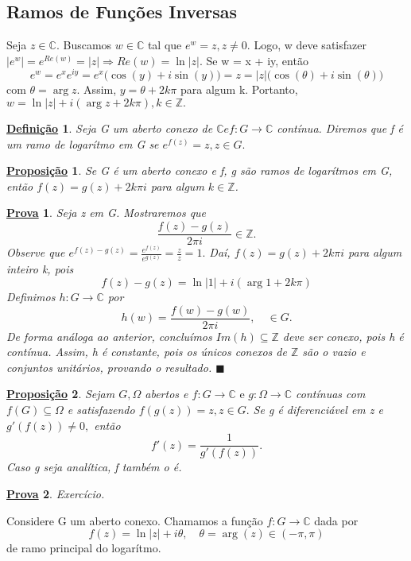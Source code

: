 \documentclass{article}
\newtheorem*{def*}{\underline{Defini\c c\~ao}}
\newtheorem*{proof*}{\underline{Prova}}
\newtheorem*{prop*}{\underline{Proposi\c c\~ao}}
\renewcommand\qedsymbol{$\blacksquare$}
\begin{document}
  \subsection{Ramos de Fun\c c\~oes Inversas}
  Seja $z\in \mathbb{C}.$ Buscamos $w\in \mathbb{C}$ tal que $e^{w} = z, z\neq0.$ Logo, w deve satisfazer $|e^{w}|
  = e^{Re(w)} = |z|\Rightarrow Re(w) = \ln{|z|}.$ Se w = x + iy, ent\~ao
  $$
  e^{w} = e^{x}e^{iy} = e^{x}\biggl(\cos{(y)} + i\sin{(y)}\biggr) = z = |z|\biggl(\cos{(\theta)} + i\sin{(\theta)}\biggr)
  $$
  com $\theta = \arg{z}.$ Assim, $y = \theta + 2k\pi$ para algum k. Portanto, $w = \ln{|z|} + i(\arg{z} + 2k\pi), k\in \mathbb{Z}.$
  \begin{def*}
    Seja G um aberto conexo de $\mathbb{C} e f:G\rightarrow \mathbb{C}$ cont\'inua. Diremos que f \'e um ramo de logar\'itmo
    em G se $e^{f(z)} = z, z\in{G}.$
  \end{def*}
  \begin{prop*}
    Se G \'e um aberto conexo e f, g s\~ao ramos de logar\'itmos em G, ent\~ao $f(z) = g(z) + 2k\pi i$ para algum
    $k\in \mathbb{Z}$.
  \end{prop*}
  \begin{proof*}
    Seja z em G. Mostraremos que 
    $$
    \frac{f(z) - g(z)}{2\pi i}\in \mathbb{Z}.
    $$
    Observe que $e^{f(z) - g(z)} = \frac{e^{f(z)}}{e^{g(z)}} = \frac{z}{z} = 1.$ Da\'i, $f(z) = g(z) + 2k\pi i$ para algum
    inteiro k, pois
    $$
    f(z) - g(z) = \ln{|1|} + i(\arg{1} + 2k\pi)
    $$
    Definimos $h:G\rightarrow \mathbb{C}$ por 
    $$
    h(w) = \frac{f(w) - g(w)}{2 \pi i}, \quad \in{G}.
    $$
    De forma an\'aloga ao anterior, conclu\'imos $Im(h)\subseteq{\mathbb{Z}}$ deve ser conexo, pois h \'e cont\'inua. Assim,
    h \'e constante, pois os \'unicos conexos de $\mathbb{Z}$ s\~ao o vazio e conjuntos unit\'arios, provando o resultado. \qedsymbol
  \end{proof*}
  \begin{prop*}
    Sejam $G, \Omega$ abertos e $f:G\rightarrow \mathbb{C}\text{ e }g:\Omega\rightarrow \mathbb{C}$ cont\'inuas com $f(G)\subseteq{\Omega}$
    e satisfazendo $f(g(z)) = z, z\in{G}.$ Se g \'e diferenci\'avel em z e $g'(f(z))\neq0,$ ent\~ao
    $$
    f'(z) = \frac{1}{g'(f(z))}.
    $$
    Caso g seja anal\'itica, f tamb\'em o \'e.
  \end{prop*}
  \begin{proof*}
    Exerc\'icio.
  \end{proof*}
  Considere G um aberto conexo. Chamamos a fun\c c\~ao $f:G\rightarrow \mathbb{C} $ dada por 
  $$
  f(z) = \ln{|z|} + i \theta, \quad \theta=\arg{(z)}\in{(-\pi, \pi)}
  $$
  de ramo principal do logar\'itmo.
  \newpage
\end{document}
